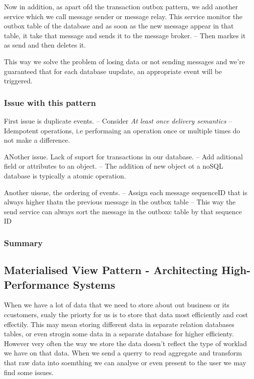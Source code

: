 \documentclass[a4paper, 11pt]{book}
\begin{document}
{    Now in addition, as apart ofd the transaction outbox pattern, we add another service which we call message sender or message relay.
    This service monitor the outbox table of the database and as soon as the new message appear in that table, it take that message and sends it to the message broker.
    -- Then markes it as send and then deletes it.

    This way we solve the problem of losing data or not sending messages and we're guaranteed that for each database uupdate, an appropriate event will be triggered.

    \subsubsection{Issue with this pattern}
    First issue is duplicate events.
    -- Consider \textit{At least once delivery semantics}
    -- Idempotent operations, i.e performaing an operation once or multiple times do not make a difference.

    ANother issue. Lack of suport for transactions in our database.
    -- Add aditional field or attributes to an object.
    -- The addition of new object ot a noSQL database is typically a atomic operation.

    Another uissue, the ordering of events.
    -- Assign each message sequenceID that is always higher thatn the previous message in the outbox table
    -- This way the send service can always sort the message in the outboxc table by that sequence ID

    \subsubsection{Summary}

    \subsection{Materialised View Pattern - Architecting High-Performance Systems}
    When we have a lot of data that we need to store about out business or its ccustomers, sualy the priorty for us is to store that data most efficiently and cost effectily.
    This may mean storing different data in separate relation databases tables, or even strogin some data in a separate database for higher efficienty.
    However very often the way we store the data doesn't reflect the type of worklad we have on that data.
    When we send a querry to read aggregate and transform that raw data into soemthing we can analyse or even present to the user we may find some issues.


}
\end{document}
